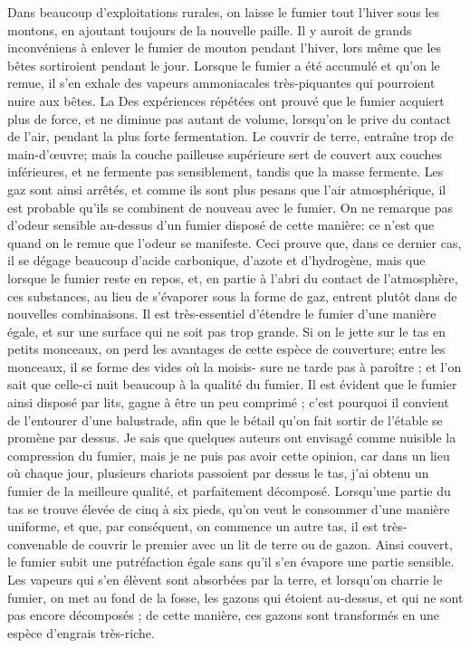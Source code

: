 Dans beaucoup d'exploitations rurales, on laisse le fumier tout l'hiver sous les montons, en ajoutant toujours de la nouvelle paille. Il y auroit de grands inconvéniens à enlever le fumier de mouton pendant l'hiver, lors même que les bêtes sortiroient pendant le jour. Lorsque le fumier a été accumulé et qu'on le remue, il s'en exhale des vapeurs ammoniacales très-piquantes qui pourroient nuire aux bêtes. La\setcounter{page}{305} Des expériences répétées ont prouvé que le fumier acquiert plus de force, et ne diminue pas autant de volume, lorsqu'on le prive du contact de l'air, pendant la plus forte fermentation. Le couvrir de terre, entraîne trop de main-d'œuvre; mais la couche pailleuse supérieure sert de couvert aux couches inférieures, et ne fermente pas sensiblement, tandis que la masse fermente. Les gaz sont ainsi arrêtés, et comme ils sont plus pesans que l'air atmosphérique, il est probable qu'ils se combinent de nouveau avec le fumier. On ne remarque pas d'odeur sensible au-dessus d'un fumier disposé de cette manière: ce n'est que quand on le remue que l'odeur se manifeste. Ceci prouve que, dans ce dernier cas, il se dégage beaucoup d'acide carbonique, d'azote et d'hydrogène, mais que lorsque le fumier reste en repos, et, en partie à l'abri du contact de l'atmosphère, ces substances, au lieu de s'évaporer sous la forme de gaz, entrent plutôt dans de nouvelles combinaisons.
Il est très-essentiel d'étendre le fumier d'une manière égale, et sur une surface qui ne soit pas trop grande. Si on le jette sur le tas en petits monceaux, on perd les avantages de cette espèce de couverture; entre les monceaux, il se forme des vides où la moisis-\setcounter{page}{306} sure ne tarde pas à paroître ; et l'on sait que celle-ci nuit beaucoup à la qualité du fumier. Il est évident que le fumier ainsi disposé par lits, gagne à être un peu comprimé ; c'est pourquoi il convient de l'entourer d'une balustrade, afin que le bétail qu'on fait sortir de l'étable se promène par dessus. Je sais que quelques auteurs ont envisagé comme nuisible la compression du fumier, mais je ne puis pas avoir cette opinion, car dans un lieu où chaque jour, plusieurs chariots passoient par dessus le tas, j'ai obtenu un fumier de la meilleure qualité, et parfaitement décomposé.
Lorsqu'une partie du tas se trouve élevée de cinq à six pieds, qu'on veut le consommer d'une manière uniforme, et que, par conséquent, on commence un autre tas, il est très-convenable de couvrir le premier avec un lit de terre ou de gazon. Ainsi couvert, le fumier subit une putréfaction égale sans qu'il s'en évapore une partie sensible. Les vapeurs qui s'en élèvent sont absorbées par la terre, et lorsqu'on charrie le fumier, on met au fond de la fosse, les gazons qui étoient au-dessus, et qui ne sont pas encore décomposés ; de cette manière, ces gazons sont transformés en une espèce d'engrais très-riche.
